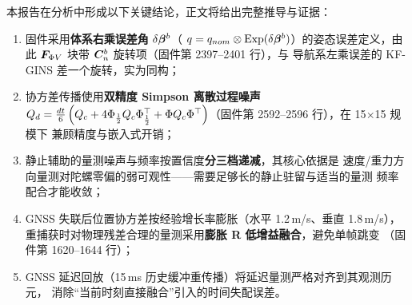 本报告在分析中形成以下关键结论，正文将给出完整推导与证据：
\begin{enumerate}
  \item 固件采用\textbf{体系右乘误差角} $\delta\boldsymbol{\beta}^b$（
    $q = q_{nom}\otimes\operatorname{Exp}(\delta\boldsymbol{\beta}^b)$）的姿态误差定义，由此
    $\boldsymbol{F}_{\Phi V}$ 块带 $\boldsymbol{C}_n^b$ 旋转项（固件第 2397--2401 行），与
    导航系左乘误差的 KF-GINS 差一个旋转，实为同构；
  \item 协方差传播使用\textbf{双精度 Simpson 离散过程噪声}
    $Q_d = \frac{dt}{6}\left(Q_c + 4\Phi_{\frac12}Q_c\Phi_{\frac12}^{\top} +
    \Phi Q_c\Phi^{\top}\right)$（固件第 2592--2596 行），在 15$\times$15 规模下
    兼顾精度与嵌入式开销；
  \item 静止辅助的量测噪声与频率按置信度\textbf{分三档递减}，其核心依据是
    速度/重力方向量测对陀螺零偏的弱可观性——需要足够长的静止驻留与适当的量测
    频率配合才能收敛；
  \item GNSS 失联后位置协方差按经验增长率膨胀（水平 1.2\,m/s、垂直 1.8\,m/s），
    重捕获时对物理残差合理的量测采用\textbf{膨胀 R 低增益融合}，避免单帧跳变
    （固件第 1620--1644 行）；
  \item GNSS 延迟回放（15\,ms 历史缓冲重传播）将延迟量测严格对齐到其观测历元，
    消除``当前时刻直接融合''引入的时间失配误差。
\end{enumerate}
